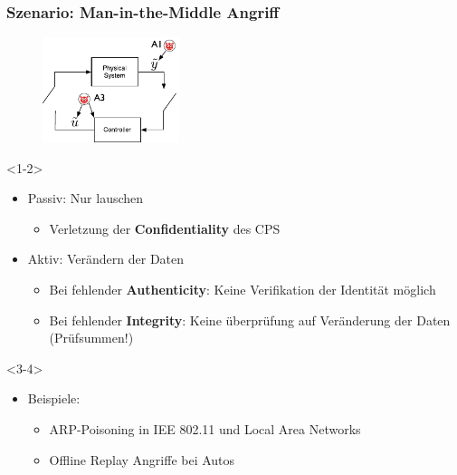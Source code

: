 \documentclass{sikslides}
\begin{document}
    \begin{frame}[t]
        \frametitle{Szenario: Man-in-the-Middle Angriff}
        \begin{overlayarea}{\linewidth}{4cm}
        \begin{figure}
            \centering
            \includegraphics[width=4cm]{figure/mitm}
        \end{figure}
        \end{overlayarea}
        \begin{onlyenv}<1-2>
            \begin{itemize}
                \item Passiv: Nur lauschen
                \begin{itemize}
                    \item Verletzung der \textbf{Confidentiality} des CPS
                    \pause
                \end{itemize}
                \item Aktiv: Verändern der Daten
                \begin{itemize}
                    \item Bei fehlender \textbf{Authenticity}: Keine Verifikation der Identität möglich
                    \item Bei fehlender \textbf{Integrity}: Keine überprüfung auf Veränderung der Daten (Prüfsummen!)
                \end{itemize}
                \pause
            \end{itemize}
        \end{onlyenv}

        \begin{onlyenv}<3-4>
            \begin{itemize}
                \item Beispiele:
                \begin{itemize}
                    \item ARP-Poisoning in IEE 802.11 und Local Area Networks
                    \pause
                    \item Offline Replay Angriffe bei Autos
                \end{itemize}
            \end{itemize}
        \end{onlyenv}

    \end{frame}
\end{document}
